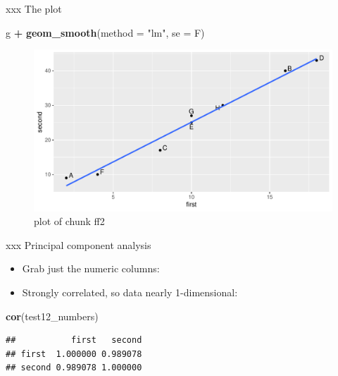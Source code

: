 \documentclass[ignorenonframetext,]{beamer}
\newenvironment{Shaded}{\begin{snugshade}}{\end{snugshade}}
\newcommand{\DataTypeTok}[1]{\textcolor[rgb]{0.13,0.29,0.53}{#1}}
\newcommand{\KeywordTok}[1]{\textcolor[rgb]{0.13,0.29,0.53}{\textbf{#1}}}
\newcommand{\NormalTok}[1]{#1}
\newcommand{\OperatorTok}[1]{\textcolor[rgb]{0.81,0.36,0.00}{\textbf{#1}}}
\newcommand{\StringTok}[1]{\textcolor[rgb]{0.31,0.60,0.02}{#1}}
\providecommand{\tightlist}{%
  \setlength{\itemsep}{0pt}\setlength{\parskip}{0pt}}
\begin{document}
\begin{frame}[fragile]{xxx The plot}
\protect\hypertarget{xxx-the-plot}{}

\begin{Shaded}
\begin{Highlighting}[]
\NormalTok{g }\OperatorTok{+}\StringTok{ }\KeywordTok{geom_smooth}\NormalTok{(}\DataTypeTok{method =} \StringTok{"lm"}\NormalTok{, }\DataTypeTok{se =}\NormalTok{ F)}
\end{Highlighting}
\end{Shaded}

\begin{figure}
\centering
\includegraphics{figure/ff2-1.pdf}
\caption{plot of chunk ff2}
\end{figure}

\end{frame}

\begin{frame}[fragile]{xxx Principal component analysis}
\protect\hypertarget{xxx-principal-component-analysis}{}

\begin{itemize}
\tightlist
\item
  Grab just the numeric columns:
\end{itemize}

\begin{Shaded}
\end{Shaded}

\begin{itemize}
\tightlist
\item
  Strongly correlated, so data nearly 1-dimensional:
\end{itemize}

\begin{Shaded}
\begin{Highlighting}[]
\KeywordTok{cor}\NormalTok{(test12_numbers)}
\end{Highlighting}
\end{Shaded}

\begin{verbatim}
##           first   second
## first  1.000000 0.989078
## second 0.989078 1.000000
\end{verbatim}

\end{frame}
\end{document}
